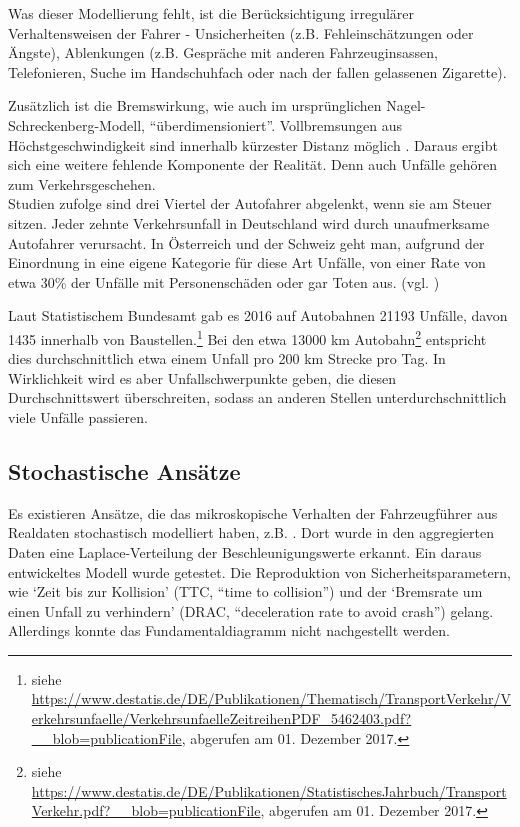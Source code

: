 Was dieser Modellierung fehlt, ist die Berücksichtigung irregulärer Verhaltensweisen der Fahrer - Unsicherheiten (z.B. Fehleinschätzungen oder Ängste), Ablenkungen (z.B. Gespräche mit anderen Fahrzeuginsassen, Telefonieren, Suche im Handschuhfach oder nach der fallen gelassenen Zigarette). 

Zusätzlich ist die Bremswirkung, wie auch im ursprünglichen Nagel-Schreckenberg-Modell, \enquote{über\-di\-men\-sio\-niert}. 
Vollbremsungen aus Höchstgeschwindigkeit sind innerhalb kürzester Distanz möglich \cite{acc-free}.
Daraus ergibt sich eine weitere fehlende Komponente der Realität.
Denn auch Unfälle gehören zum Verkehrsgeschehen. \\
Studien zufolge sind drei Viertel der Autofahrer abgelenkt, wenn sie am Steuer sitzen. 
Jeder zehnte Verkehrsunfall in Deutschland wird durch unaufmerksame Autofahrer verursacht. 
In Österreich und der Schweiz geht man, aufgrund der Einordnung in eine eigene Kategorie für diese Art Unfälle, von einer Rate von etwa 30\% der Unfälle mit Personenschäden oder gar Toten aus. (vgl. \cite{dvr-studie})

Laut Statistischem Bundesamt gab es 2016 auf Autobahnen 21193 Unfälle, davon 1435 innerhalb von Baustellen.\footnote{siehe \url{https://www.destatis.de/DE/Publikationen/Thematisch/TransportVerkehr/Verkehrsunfaelle/VerkehrsunfaelleZeitreihenPDF_5462403.pdf?__blob=publicationFile}, abgerufen am 01. Dezember 2017.} %
Bei den etwa 13000 km Autobahn\footnote{siehe \url{https://www.destatis.de/DE/Publikationen/StatistischesJahrbuch/TransportVerkehr.pdf?__blob=publicationFile}, abgerufen am 01. Dezember 2017.} %
entspricht dies durchschnittlich etwa einem Unfall pro 200 km Strecke pro Tag. 
In Wirklichkeit wird es aber Unfallschwerpunkte geben, die diesen Durchschnittswert überschreiten, sodass an anderen Stellen unterdurchschnittlich viele Unfälle passieren.



\subsection{Stochastische Ansätze}
\label{sec:stochastic-approaches}

Es existieren Ansätze, die das mikroskopische Verhalten der Fahrzeugführer aus Realdaten  stochastisch modelliert haben, z.B. \cite{stoch-carfollow}. 
Dort wurde in den aggregierten Daten eine Laplace-Verteilung der Beschleunigungswerte erkannt. 
Ein daraus entwickeltes Modell wurde getestet. 
Die Reproduktion von Sicherheitsparametern, wie \enquote*{Zeit bis zur Kollision} (TTC, \enquote{time to collision}) und der \enquote*{Bremsrate um einen Unfall zu verhindern} (DRAC, \enquote{deceleration rate to avoid crash}) gelang. 
Allerdings konnte das Fundamentaldiagramm nicht nachgestellt werden.

